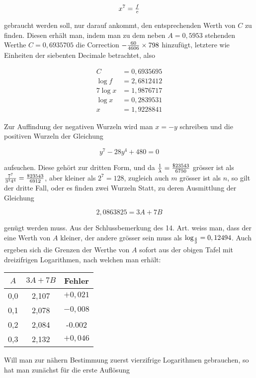 \documentclass[twoside,12pt, showframe]{memoir}
\let\oldfrac\frac
\def\frac#1#2{\mathchoice{\tfrac{#1}{#2}}{\oldfrac{#1}{#2}}{\genfrac{}{}{}{2}{#1}{#2\mathstrut}}{\genfrac{}{}{}{3}{#1}{#2\mathstrut}}}
\begin{document}
\[
x^{7}=\frac{f}{e}
\]

gebraucht werden soll, nur darauf ankommt, den entsprechenden Werth von \(C\) zu finden. Diesen erhält man, indem man zu dem neben \(A=0,5953\) stehenden Werthe \(C=0,6935705\) die Correction \(-\frac{60}{4606} \times 798\) hinzufügt, letztere wie Einheiten der siebenten Decimale betrachtet, also

\[
\begin{aligned}
C & =0,6935695 \\
\log f & =2,6812412 \\
\hline 7 \log x & =1,9876717 \\
\log x & =0,2839531 \\
x & =1,9228841
\end{aligned}
\]

Zur Auffindung der negativen Wurzeln wird man \(x=-y\) schreiben und die positiven Wurzeln der Gleichung

\[
y^{7}-28 y^{4}+480=0
\]

aufsuchen. Diese gehört zur dritten Form, und da \(\frac{1}{\lambda}=\frac{\$ 23543}{6750}\) grösser ist als \(\frac{7^{7}}{3^{3} 4^{4}}=\frac{\$ 23543}{6912}\), aber kleiner als \(2^{7}=128\), zugleich auch \(m\) grösser ist als \(n\), so gilt der dritte Fall, oder es finden zwei Wurzeln Statt, zu deren Ausmittlung der Gleichung

\[
2,0863825=3 A+7 B
\]

genügt werden muss. Aus der Schlussbemerkung des 14. Art. weiss man, dass der eine Werth von \(A\) kleiner, der andere grösser sein muss als \(\log _{\frac{4}{3}}=0,12494\). Auch ergeben sich die Grenzen der Werthe von \(A\) sofort aus der obigen Tafel mit dreizifrigen Logarithmen, nach welchen man erhält:

\begin{center}
\begin{tabular}{c|c|c}
\(A\) & \(3 A+7 B\) & Fehler \\
\hline
0,0 & 2,107 & \(+0,021\) \\
0,1 & 2,078 & \(-0,008\) \\
0,2 & 2,084 & -0.002 \\
0,3 & 2,132 & \(+0,046\) \\
\end{tabular}
\end{center}

Will man zur nähern Bestimmung zuerst vierzifrige Logarithmen gebrauchen, so hat man zunächst für die erste Auflösung
\end{document}
